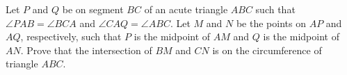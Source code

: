Let $P$ and $Q$ be on segment $BC$ of an acute triangle $ABC$ such that $\angle PAB=\angle BCA$ and $\angle CAQ=\angle ABC$. Let $M$ and $N$ be the points on $AP$ and $AQ$, respectively, such that $P$ is the midpoint of $AM$ and $Q$ is the midpoint of $AN$. Prove that the intersection of $BM$ and $CN$ is on the circumference of triangle $ABC$.